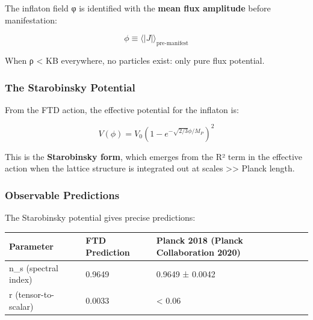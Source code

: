 \documentclass[
  11pt,
  letterpaper,
  twoside,
  openright]{book}
\begin{document}
The inflaton field φ is identified with the \textbf{mean flux amplitude}
before manifestation:

\[\phi \equiv \langle |J| \rangle_{\text{pre-manifest}}\]

When ρ \textless{} KB everywhere, no particles exist: only pure flux
potential.

\subsubsection{The Starobinsky
Potential}\label{the-starobinsky-potential}

From the FTD action, the effective potential for the inflaton is:

\[V(\phi) = V_0 \left(1 - e^{-\sqrt{2/3}\phi/M_P}\right)^2\]

This is the \textbf{Starobinsky form}, which emerges from the R² term in
the effective action when the lattice structure is integrated out at
scales \textgreater\textgreater{} Planck length.

\subsubsection{Observable Predictions}\label{observable-predictions}

The Starobinsky potential gives precise predictions:

\begin{longtable}[]{@{}lll@{}}
\toprule\noalign{}
Parameter & FTD Prediction & Planck 2018 (Planck Collaboration 2020) \\
\midrule\noalign{}
\endhead
\bottomrule\noalign{}
\endlastfoot
n\_s (spectral index) & 0.9649 & 0.9649 ± 0.0042 \\
r (tensor-to-scalar) & 0.0033 & \textless{} 0.06 \\
\end{longtable}
\end{document}
